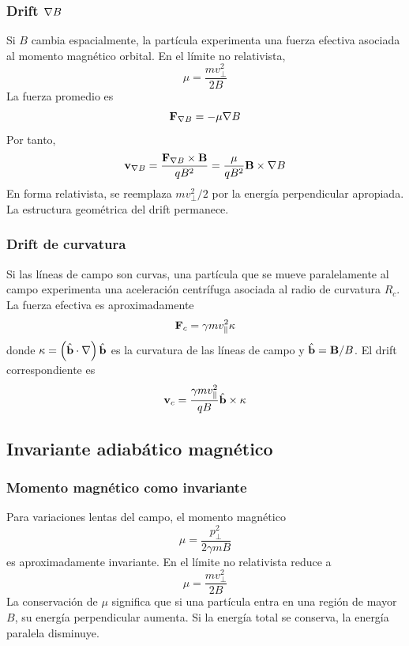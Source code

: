 \documentclass[]{article}
\numberwithin{equation}{section}
\begin{document}
\subsubsection{Drift $\nabla B$}
Si $ B$ cambia espacialmente, la partícula experimenta una fuerza efectiva asociada al momento magnético orbital. En el límite no relativista,
\begin{equation}
	\mu = \frac{m v_\perp^2}{2 B}
\end{equation}
La fuerza promedio es
\begin{equation}
	\mathbf{F}_{\nabla B} = -\mu\nabla B
\end{equation}
Por tanto,
\begin{equation}
	\mathbf{v}_{\nabla B} = \frac{\mathbf{F}_{\nabla B}\times\mathbf{B}}{qB^2} = \frac{\mu}{q B^2}  \mathbf{B}\times\nabla B
\end{equation}
En forma relativista, se reemplaza $m v_\perp^2 / 2$ por la energía perpendicular apropiada. La estructura geométrica del drift permanece.

\subsubsection{Drift de curvatura}
Si las líneas de campo son curvas, una partícula que se mueve paralelamente al campo experimenta una aceleración centrífuga asociada al radio de curvatura $R_c$. La fuerza efectiva es aproximadamente
\begin{equation}
	\mathbf{F}_c = \gamma m v_\parallel^2 \mathbf{\kappa}
\end{equation}
donde $\mathbf{\kappa} = \left(\hat{\mathbf{b}}\cdot\nabla\right) \hat{\mathbf{b}}$ es la curvatura de las líneas de campo y $\hat{\mathbf{b}} = \mathbf{B}/B$. El drift correspondiente es
\begin{equation}
	\mathbf{v}_c = \frac{\gamma m v_\parallel^2}{q B} \hat{\mathbf{b}}\times\mathbf{\kappa}
\end{equation}

\subsection{Invariante adiabático magnético}
\subsubsection{Momento magnético como invariante}
Para variaciones lentas del campo, el momento magnético
\begin{equation}
	\mu = \frac{p_\perp^2}{2 \gamma m B}
\end{equation}
es aproximadamente invariante. En el límite no relativista reduce a
\begin{equation}
	\mu = \frac{m v_\perp^2}{2 B}
\end{equation}
La conservación de $\mu$ significa que si una partícula entra en una región de mayor $B$, su energía perpendicular aumenta. Si la energía total se conserva, la energía paralela disminuye.
\end{document}

